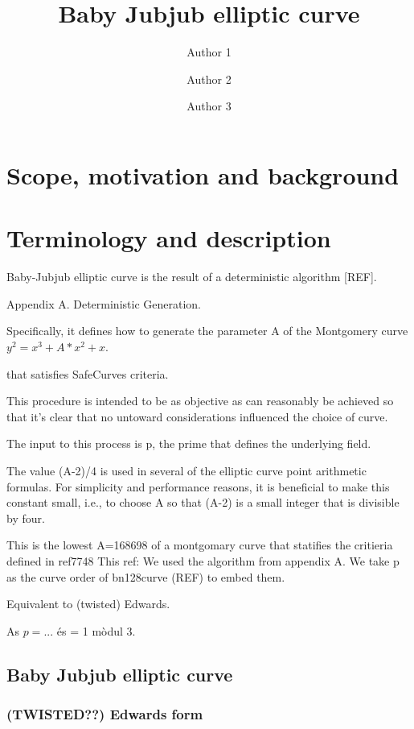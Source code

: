 \documentclass{article}
\title{ Baby Jubjub elliptic curve \vspace{-0.2cm} }
\author[1]{Author 1}
\author[2]{Author 2}
\author[1]{Author 3}
\affil[1]{Affiliation 1}
\affil[2]{Affiliation 2}
\date{} %
\begin{document}
\maketitle 
\vspace{1cm}
\tableofcontents

\vspace{0.5cm}


\section{Scope, motivation and background}	

\section{Terminology and description}

Baby-Jubjub elliptic curve is the result of a deterministic algorithm [REF]. 

Appendix A.  Deterministic Generation. 

Specifically, it defines how to generate the parameter
A of the Montgomery curve $y^2 = x^3 + A*x^2 + x$.  

that satisfies SafeCurves criteria.

This procedure is
intended to be as objective as can reasonably be achieved so that
it's clear that no untoward considerations influenced the choice of
curve.  

The input to this process is p, the prime that defines the
underlying field. 

The value (A-2)/4 is used in several of the elliptic curve point
arithmetic formulas.  For simplicity and performance reasons, it is
beneficial to make this constant small, i.e., to choose A so that
(A-2) is a small integer that is divisible by four.

This is the lowest A=168698 of a montgomary curve that statifies the critieria defined in ref7748
This ref: We used the algorithm from appendix A.%
We take p as the curve order of bn128curve (REF) to embed them.

Equivalent to (twisted) Edwards.

As
$p=...$
és = 1 mòdul 3.
	\subsection{Baby Jubjub elliptic curve}
		\subsubsection{(TWISTED??) Edwards form}
\end{document}
